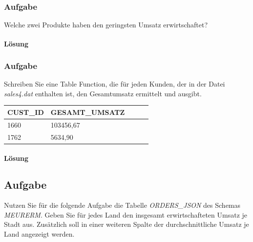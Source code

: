 \subsubsection{Aufgabe}
\label{subsec:uebung_12.aufgabe_01d}
Welche zwei Produkte haben den geringsten Umsatz erwirtschaftet?

\paragraph{Lösung}
\label{subsubsec:uebung_12.aufgabe_01d.loesung}


\subsubsection{Aufgabe}
\label{subsec:uebung_12.aufgabe_01e}
Schreiben Sie eine Table Function, die für jeden Kunden, der in der Datei \textit{sales4.dat} enthalten ist, den Gesamtumsatz ermittelt und ausgibt.

\begin{table}[H]
  \centering
  \begin{tabular}{|l|l|l|l|l|}
    \hline
    \textbf{CUST\_ID} & \textbf{GESAMT\_UMSATZ} \\
    \hline
    1660              & 103456,67 \\
    1762              & 5634,90 \\
    \hline
  \end{tabular}
\end{table}

\paragraph{Lösung}
\label{subsubsec:uebung_12.aufgabe_01e.loesung}


\subsection{Aufgabe}
\label{subsec:uebung_12.aufgabe_02}
Nutzen Sie für die folgende Aufgabe die Tabelle \textit{ORDERS\_JSON} des Schemas \textit{MEURERM}. Geben Sie für jedes Land den insgesamt erwirtschafteten Umsatz je Stadt aus. Zusätzlich soll in einer weiteren Spalte der durchschnittliche Umsatz je Land angezeigt werden.

